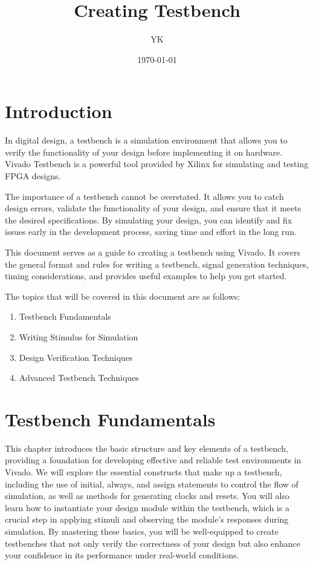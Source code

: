 \documentclass{report}
\title{Creating Testbench}
\author{YK}
\date{\today}
\begin{document}
\maketitle
\chapter{Introduction}
In digital design, a testbench is a simulation environment that allows you to verify the functionality of your design before implementing it on hardware. Vivado Testbench is a powerful tool provided by Xilinx for simulating and testing FPGA designs.

The importance of a testbench cannot be overstated. It allows you to catch design errors, validate the functionality of your design, and ensure that it meets the desired specifications. By simulating your design, you can identify and fix issues early in the development process, saving time and effort in the long run.

This document serves as a guide to creating a testbench using Vivado. It covers the general format and rules for writing a testbench, signal generation techniques, timing considerations, and provides useful examples to help you get started.

The topics that will be covered in this document are as follows:
\begin{enumerate}
    \item Testbench Fundamentals
    \item Writing Stimulus for Simulation
    \item Design Verification Techniques
    \item Advanced Testbench Techniques
\end{enumerate}

\chapter{Testbench Fundamentals}
This chapter introduces the basic structure and key elements of a testbench, providing a foundation for developing effective and reliable test environments in Vivado. We will explore the essential constructs that make up a testbench, including the use of initial, always, and assign statements to control the flow of simulation, as well as methods for generating clocks and resets. You will also learn how to instantiate your design module within the testbench, which is a crucial step in applying stimuli and observing the module's responses during simulation. By mastering these basics, you will be well-equipped to create testbenches that not only verify the correctness of your design but also enhance your confidence in its performance under real-world conditions.
\end{document}
